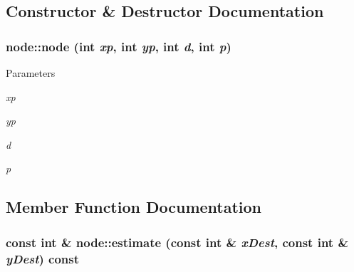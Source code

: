 \subsection{Constructor \& Destructor Documentation}
\hypertarget{classnode_a802701cab6639590de6f16136184c2de}{
\subsubsection[{node}]{\setlength{\rightskip}{0pt plus 5cm}node::node (int {\em xp}, \/  int {\em yp}, \/  int {\em d}, \/  int {\em p})}}
\label{classnode_a802701cab6639590de6f16136184c2de}

\begin{DoxyParams}{Parameters}
\item[{\em xp}]\item[{\em yp}]\item[{\em d}]\item[{\em p}]\end{DoxyParams}


\subsection{Member Function Documentation}
\hypertarget{classnode_a311569dff2e77c4c7953107333960a5d}{
\subsubsection[{estimate}]{\setlength{\rightskip}{0pt plus 5cm}const int \& node::estimate (const int \& {\em xDest}, \/  const int \& {\em yDest}) const}}
\label{classnode_a311569dff2e77c4c7953107333960a5d}

